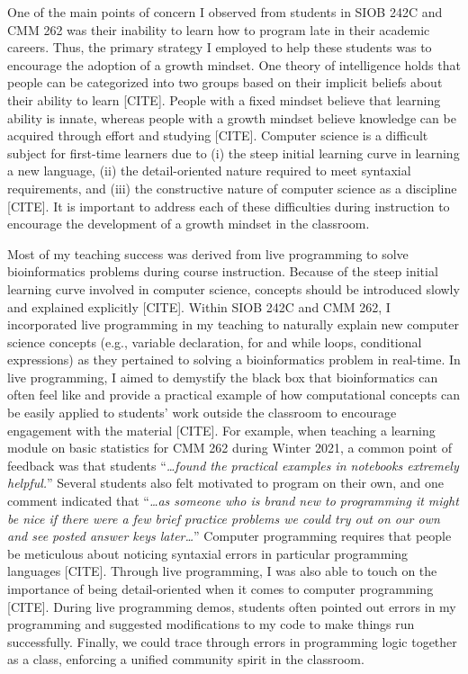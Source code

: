 One of the main points of concern I observed from students in SIOB 242C and CMM 262 was their inability to learn how to program late in their academic careers. Thus, the primary strategy I employed to help these students was to encourage the adoption of a growth mindset. One theory of intelligence holds that people can be categorized into two groups based on their implicit beliefs about their ability to learn [CITE]. People with a fixed mindset believe that learning ability is innate, whereas people with a growth mindset believe knowledge can be acquired through effort and studying [CITE]. Computer science is a difficult subject for first-time learners due to (i) the steep initial learning curve in learning a new language, (ii) the detail-oriented nature required to meet syntaxial requirements, and (iii) the constructive nature of computer science as a discipline [CITE]. It is important to address each of these difficulties during instruction to encourage the development of a growth mindset in the classroom. 

Most of my teaching success was derived from live programming to solve bioinformatics problems during course instruction. Because of the steep initial learning curve involved in computer science, concepts should be introduced slowly and explained explicitly [CITE]. Within SIOB 242C and CMM 262, I incorporated live programming in my teaching to naturally explain new computer science concepts (e.g., variable declaration, for and while loops, conditional expressions) as they pertained to solving a bioinformatics problem in real-time. In live programming, I aimed to demystify the black box that bioinformatics can often feel like and provide a practical example of how computational concepts can be easily applied to students’ work outside the classroom to encourage engagement with the material [CITE]. For example, when teaching a learning module on basic statistics for CMM 262 during Winter 2021, a common point of feedback was that students “\textit{…found the practical examples in notebooks extremely helpful.}” Several students also felt motivated to program on their own, and one comment indicated that “\textit{…as someone who is brand new to programming it might be nice if there were a few brief practice problems we could try out on our own and see posted answer keys later…}” Computer programming requires that people be meticulous about noticing syntaxial errors in particular programming languages [CITE]. Through live programming, I was also able to touch on the importance of being detail-oriented when it comes to computer programming [CITE]. During live programming demos, students often pointed out errors in my programming and suggested modifications to my code to make things run successfully. Finally, we could trace through errors in programming logic together as a class, enforcing a unified community spirit in the classroom. 

